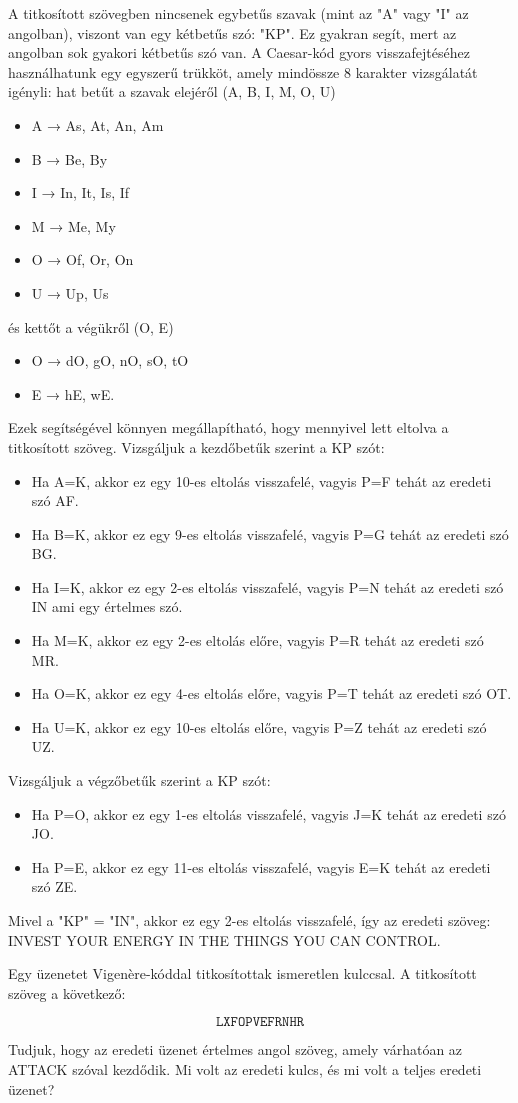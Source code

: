\begin{solution}
A titkosított szövegben nincsenek egybetűs szavak (mint az "A" vagy
"I" az angolban), viszont van egy kétbetűs szó: "KP". Ez gyakran
segít, mert az angolban sok gyakori kétbetűs szó van. A Caesar-kód
gyors visszafejtéséhez használhatunk egy egyszerű trükköt, amely mindössze
8 karakter vizsgálatát igényli: hat betűt a szavak elejéről (A, B,
I, M, O, U) 
\begin{itemize}
\item A → As, At, An, Am 
\item B → Be, By 
\item I → In, It, Is, If 
\item M → Me, My 
\item O → Of, Or, On 
\item U → Up, Us 
\end{itemize}
és kettőt a végükről (O, E) 
\begin{itemize}
\item O → dO, gO, nO, sO, tO 
\item E → hE, wE. 
\end{itemize}
Ezek segítségével könnyen megállapítható, hogy mennyivel lett eltolva
a titkosított szöveg. Vizsgáljuk a kezdőbetűk szerint a KP szót: 
\begin{itemize}
\item Ha A=K, akkor ez egy 10-es eltolás visszafelé, vagyis P=F tehát az
eredeti szó AF. 
\item Ha B=K, akkor ez egy 9-es eltolás visszafelé, vagyis P=G tehát az
eredeti szó BG. 
\item Ha I=K, akkor ez egy 2-es eltolás visszafelé, vagyis P=N tehát az
eredeti szó IN ami egy értelmes szó. 
\item Ha M=K, akkor ez egy 2-es eltolás előre, vagyis P=R tehát az eredeti
szó MR. 
\item Ha O=K, akkor ez egy 4-es eltolás előre, vagyis P=T tehát az eredeti
szó OT. 
\item Ha U=K, akkor ez egy 10-es eltolás előre, vagyis P=Z tehát az eredeti
szó UZ. 
\end{itemize}
Vizsgáljuk a végzőbetűk szerint a KP szót: 
\begin{itemize}
\item Ha P=O, akkor ez egy 1-es eltolás visszafelé, vagyis J=K tehát az
eredeti szó JO. 
\item Ha P=E, akkor ez egy 11-es eltolás visszafelé, vagyis E=K tehát az
eredeti szó ZE. 
\end{itemize}
Mivel a "KP" = "IN", akkor ez egy 2-es eltolás visszafelé, így
az eredeti szöveg: INVEST YOUR ENERGY IN THE THINGS YOU CAN CONTROL.
\end{solution}
\begin{extraproblem}
Egy üzenetet Vigenère-kóddal titkosítottak ismeretlen kulccsal. A
titkosított szöveg a következő:

\[
\texttt{LXFOPVEFRNHR}
\]

Tudjuk, hogy az eredeti üzenet értelmes angol szöveg, amely várhatóan
az ATTACK szóval kezdődik. Mi volt az eredeti kulcs, és mi volt a
teljes eredeti üzenet?
\end{extraproblem}

